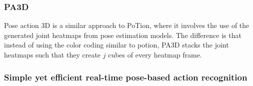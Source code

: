 \documentclass[10pt,twocolumn,letterpaper]{article}
\begin{document}
\subsubsection{PA3D}

Pose action 3D \cite{PA3D} is a similar approach to PoTion, where it involves the use of the generated joint heatmaps from pose estimation models. The difference is that instead of using the color coding similar to potion, PA3D stacks the joint heatmaps such that they create $j$ cubes of every heatmap frame.

\subsubsection{Simple yet efficient real-time pose-based action recognition}

{\small


}
\end{document}
